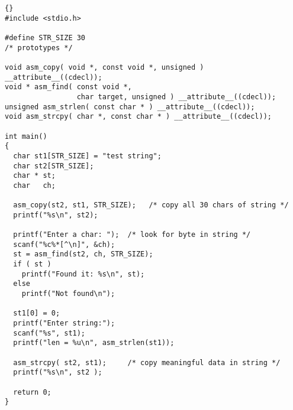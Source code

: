 \begin{lstlisting}{}
#include <stdio.h>

#define STR_SIZE 30
/* prototypes */

void asm_copy( void *, const void *, unsigned ) __attribute__((cdecl));
void * asm_find( const void *, 
                 char target, unsigned ) __attribute__((cdecl));
unsigned asm_strlen( const char * ) __attribute__((cdecl));
void asm_strcpy( char *, const char * ) __attribute__((cdecl));

int main()
{
  char st1[STR_SIZE] = "test string";
  char st2[STR_SIZE];
  char * st;
  char   ch;

  asm_copy(st2, st1, STR_SIZE);   /* copy all 30 chars of string */
  printf("%s\n", st2);

  printf("Enter a char: ");  /* look for byte in string */
  scanf("%c%*[^\n]", &ch);
  st = asm_find(st2, ch, STR_SIZE);
  if ( st )
    printf("Found it: %s\n", st);
  else
    printf("Not found\n");

  st1[0] = 0;
  printf("Enter string:");
  scanf("%s", st1);
  printf("len = %u\n", asm_strlen(st1));

  asm_strcpy( st2, st1);     /* copy meaningful data in string */
  printf("%s\n", st2 );

  return 0;
}
\end{lstlisting}













